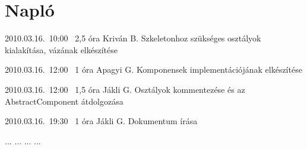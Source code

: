 %
\section{Napló}

\begin{naplo}

\bejegyzes
{2010.03.16.~10:00~} %
{2,5 óra} %
{Kriván B.} %
{Szkeletonhoz szükséges osztályok kialakítása, vázának elkészítése} %

\bejegyzes
{2010.03.16.~12:00~} %
{1 óra} %
{Apagyi G.} %
{Komponensek implementációjának elkészítése} %

\bejegyzes
{2010.03.16.~12:00~} %
{1,5 óra} %
{Jákli G.} %
{Osztályok kommentezése és az AbstractComponent átdolgozása} %

\bejegyzes
{2010.03.16.~19:30~} %
{1 óra} %
{Jákli G.} %
{Dokumentum írása} %


\bejegyzes
{...}
{...}
{...}
{...}


\end{naplo}

